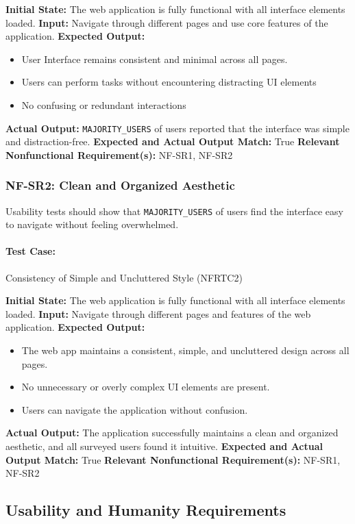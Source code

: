 \documentclass[12pt, titlepage]{article}
\begin{document}
\textbf{Initial State:} The web application is fully functional with all interface elements loaded.
\textbf{Input:} Navigate through different pages and use core features of the application.
\textbf{Expected Output:}
\begin{itemize}
    \item User Interface remains consistent and minimal across all pages.
    \item Users can perform tasks without encountering distracting UI elements
    \item No confusing or redundant interactions
\end{itemize}
\textbf{Actual Output:} \verb|MAJORITY_USERS| of users reported that the interface was simple and distraction-free.
\textbf{Expected and Actual Output Match:} True  
\textbf{Relevant Nonfunctional Requirement(s):} NF-SR1, NF-SR2  

\subsubsection{NF-SR2: Clean and Organized Aesthetic}
Usability tests should show that \verb|MAJORITY_USERS| of users find the interface easy to navigate without feeling overwhelmed.

\paragraph{Test Case:} Consistency of Simple and Uncluttered Style (NFRTC2)

\textbf{Initial State:} The web application is fully functional with all interface elements loaded.  
\textbf{Input:} Navigate through different pages and features of the web application.  
\textbf{Expected Output:}
\begin{itemize}
    \item The web app maintains a consistent, simple, and uncluttered design across all pages.
    \item No unnecessary or overly complex UI elements are present.
    \item Users can navigate the application without confusion.
\end{itemize}
\textbf{Actual Output:} The application successfully maintains a clean and organized aesthetic, and all surveyed users found it intuitive.  
\textbf{Expected and Actual Output Match:} True  
\textbf{Relevant Nonfunctional Requirement(s):} NF-SR1, NF-SR2  

\subsection{Usability and Humanity Requirements}
\end{document}
